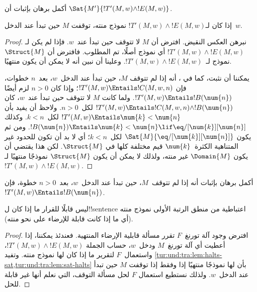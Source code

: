 \documentclass[../../../include/open-logic-section]{subfiles}
\begin{document}
\begin{prob}
  أكمل برهان  بإثبات أن
  $\Sat{M'}{!T'(M,w)\land !E(M,w)}$.
\end{prob}

\begin{lem}
  إذا كان لـ$!T'(M,w)\land !E(M,w)$ نموذج منته، توقفت $M$ حين تبدأ
  عند الدخل~$w$.
\end{lem}

\begin{proof}
  نبرهن العكس النقيض. افترض أن $M$ لا تتوقف حين تبدأ عند~$w$. فإذا
  لم يكن لـ$!T'(M,w)\land !E(M,w)$ أي نموذج أصلًا، تم المطلوب. فافترض
  أن $\Struct{M}$ نموذج لـ~$!T'(M,w)\land !E(M,w)$. وعلينا أن نبين
  أنه لا يمكن أن يكون منتهيًا.

  يمكننا أن نثبت، كما في ، أنه إذا لم تتوقف
  $M$، حين تبدأ عند الدخل~$w$، بعد~$n$ خطوات، فإن
  $!T'(M,w)\Entails !C(M,w,n)$؛ وإذا كان $n>0$ لزم أيضًا
  $!T'(M,w)\Entails !B(\num{n})$. ولما كانت $M$ لا
  تتوقف حين تبدأ عند~$w$، كان
  $!T'(M,w)\Entails !C(M,w,n)\land !B(\num{n})$ لكل~$n>0$.
  ولاحظ أن  يفيد بأن
  $!T'(M,w)\Entails\num{k}<\num{n}$ لكل~$k<n$. وكذلك
  $!B(\num{n})\Entails\num{k}<\num{n}\lif
  \eq/[\num{k}][\num{n}]$. ومن ثم يكون
  $\Sat{M}{\eq/[\num{k}][\num{n}]}$ لكل~$k<n$؛ أي لا بد أن تكون
  للحدود غير المتناهية الكثرة~$\num{k}$ قيم مختلفة كلها في
  $\Struct{M}$. لكن هذا يقتضي أن يكون $\Domain{M}$ غير منته، ولذلك
  لا يمكن أن يكون $\Struct{M}$ نموذجًا منتهيًا لـ
  $!T'(M,w)\land !E(M,w)$.
\end{proof}

\begin{prob}
  أكمل برهان  بإثبات أنه إذا لم
  تتوقف~$M$، حين تبدأ عند الدخل~$w$، بعد~$n>0$ خطوة، فإن
  $!T'(M,w)\Entails !B(\num{n})$.
\end{prob}

\begin{thm}
  ليس قابلًا للقرار ما إذا كان ل!!{sentence} اعتباطية من منطق الرتبة
  الأولى نموذج منته (أي ما إذا كانت قابلة للإرضاء على نحو منته).
\end{thm}

\begin{proof}
  افترض وجود آلة تورنغ~$F$ تقرر مسألة قابلية الإرضاء المنتهية. فعندئذ
  يمكننا، إذا أعطيت أي آلة تورنغ~$M$ ودخل~$w$، حساب الجملة
  $!T'(M,w)\land !E(M,w)$، واستعمال~$F$ لتقرير ما إذا كان لها نموذج
  منته. وتفيد
  \cref{tur:und:tra:lem:halts-sat,tur:und:tra:lem:sat-halts} بأن لها
  نموذجًا منتهيًا إذا وفقط إذا توقفت $M$ حين تبدأ عند الدخل~$w$.
  ولذلك نستطيع استعمال $F$ لحل مسألة التوقف، التي نعلم أنها غير قابلة
  للحل.
\end{proof}
\end{document}
